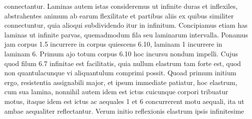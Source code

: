 %
connectantur. Laminas autem istas consideremus ut infinite duras et inflexiles,\protect{}  
%
abstrahentes animum ab earum flexilitate%
\protect{} et partibus aliis ex quibus similiter connectuntur, quia alioqui subdividendo 
%
 itur in infinitum. Concipiamus etiam has laminas ut infinite parvas,\protect{}   
%
quemadmodum fila%
\protect{} seu laminarum%
\protect{} intervalla. Ponamus jam corpus 
%
 1.5 incurrere in corpus quiescens 6.10, 
%
%
%
laminam\protect{} 1 incurrere in laminam\protect{} 6. Primum ajo totum corpus 6.10 hoc incursu nondum impelli.  
%
Cujus 
 quod filum 6.7 
%
%
infinitae est facilitatis, quia nullum elastrum\protect{} tam forte est, quod non quantulacunque vi%
\protect{}  
%
aliquantulum comprimi possit. Quoad primum initium ergo, 
%
%
 resistentia\protect{} assignabili major, et ipsum immediate patiatur, hoc  
%
elastrum\protect{}, cum sua lamina\protect{}, nonnihil 
%
%
autem idem est ictus\protect{} cuicunque corpori tribuatur motus,%
\protect{} itaque idem est  
%
ictus\protect{} ac 
%
%
 aequales 1 et 6 concurrerent motu aequali, ita ut ambae aequaliter reflectantur. Verum initio  
%
reflexionis\protect{} elastrum\protect{} ipsis infinitesime  

